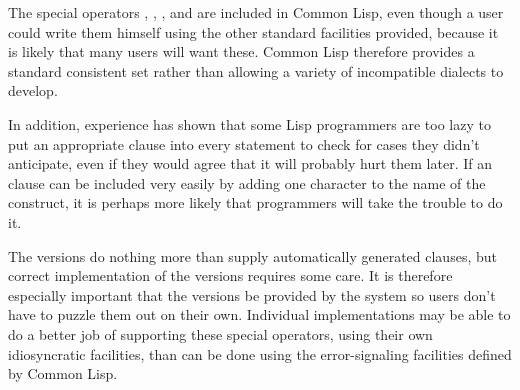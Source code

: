 \beforenoterule
\begin{rationale}
The special operators
, , , and 
are included in Common Lisp, even though a user
could write them himself using the other standard facilities provided,
because it is likely that many users will want these.
Common Lisp therefore provides
a standard consistent set rather than allowing
a variety of incompatible dialects to develop.

In addition, experience has shown that
some Lisp programmers are too lazy to put an appropriate
 clause into every  statement to
check for cases they
didn't anticipate, even if they would agree that it will probably 
hurt them later.  If an  clause can be included
very easily by adding one character to the name of the construct,
it is perhaps more likely that programmers will take the trouble to do it. 

The  versions do nothing more than supply
automatically generated  clauses, but correct
implementation of the  versions
requires some care.  It is therefore especially
important that the  versions be provided
by the system so users don't have to puzzle them out on
their own.  Individual implementations may be able to do a better job
of supporting these special operators,
using their own idiosyncratic facilities, than can be done
using the error-signaling facilities defined by Common Lisp.
\end{rationale}
\afternoterule
